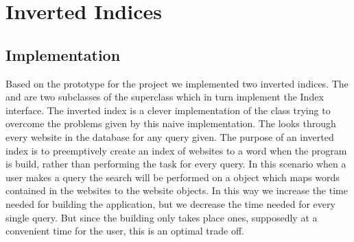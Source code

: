 \section{Inverted Indices}

\subsection{Implementation}\label{sec:invertedindicies-imp}
Based on the prototype for the project we implemented two inverted indices. The  and  are two subclasses of the superclass  which in turn implement the Index interface. The inverted index is a clever implementation of the  class trying to overcome the problems given by this naive implementation. The  looks through every website in the database for any query given. The purpose of an inverted index is to preemptively create an index of websites to a word when the program is build, rather than performing the task for every query. In this scenario when a user makes a query the search will be performed on a  object which maps words contained in the websites to the website objects. In this way we increase the time needed for building the application, but we decrease the time needed for every single query. But since the building only takes place ones, supposedly at a convenient time for the user, this is an optimal trade off.

